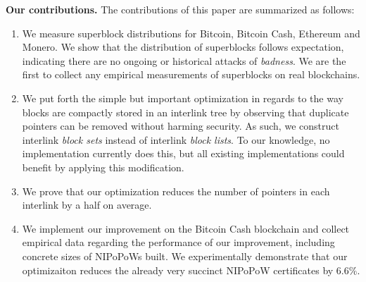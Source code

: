 \noindent
\textbf{Our contributions.} The contributions of this paper are summarized as
follows:

\begin{enumerate}
  \item We measure superblock distributions for Bitcoin, Bitcoin Cash, Ethereum
        and Monero. We show that the distribution of superblocks follows
        expectation, indicating there are no ongoing or historical attacks of
        \emph{badness}. We are the first to collect any empirical measurements
        of superblocks on real blockchains.
  \item We put forth the simple but important optimization in regards to the way
        blocks are compactly stored in an interlink tree by observing that
        duplicate pointers can be removed without harming security. As such, we
        construct interlink \emph{block sets} instead of interlink \emph{block
        lists}. To our knowledge, no implementation currently does this, but all
        existing implementations could benefit by applying this modification.
  \item We prove that our optimization reduces the number of pointers in each
        interlink by a half on average.
  \item We implement our improvement on the Bitcoin Cash blockchain and collect
        empirical data regarding the performance of our improvement, including
        concrete sizes of NIPoPoWs built. We experimentally demonstrate that our
        optimizaiton reduces the already very succinct NIPoPoW certificates by
        $6.6\%$.
\end{enumerate}
